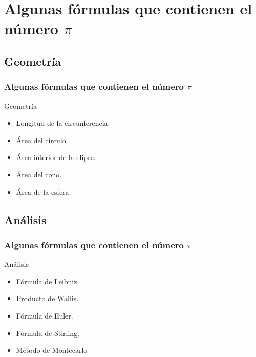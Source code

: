 \documentclass{beamer}
\begin{document}
\section{Algunas fórmulas que contienen el número $\pi$}
\subsection{Geometría} 

\begin{frame}
\frametitle{Algunas fórmulas que contienen el número $\pi$} 

\begin{block}{Geometría}

\begin{itemize}

  \item Longitud de la circunferencia.
  \pause
  \item Área del círculo.
  \pause
  \item Área interior de la elipse.
  \pause
  \item Área del cono.
  \pause
  \item Área de la esfera.

\end{itemize}
\end{block}

\end{frame}

\subsection{Análisis}
\begin{frame}
\frametitle{Algunas fórmulas que contienen el número $\pi$}
\begin{block}{Análisis}
\begin{itemize}
  \item Fórmula de Leibniz.
  \pause
  \item Producto de Wallis.
  \pause
  \item Fórmula de Euler.
  \pause
  \item Fórmula de Stirling.
  \pause
  \item Método de Montecarlo

\end{itemize}
\end{block}

\end{frame}
\end{document}
